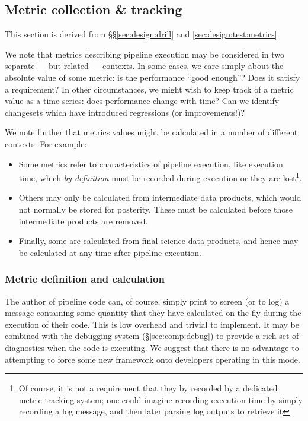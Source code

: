 \subsection{Metric collection \& tracking}
\label{sec:comp:metric}

This section is derived from \S\S\ref{sec:design:drill} and \ref{sec:design:test:metrics}.

We note that metrics describing pipeline execution may be considered in two separate --- but related --- contexts.
In some cases, we care simply about the absolute value of some metric: is the performance ``good enough''?
Does it satisfy a requirement?
In other circumstances, we might wish to keep track of a metric value as a time series: does performance change with time?
Can we identify changesets which have introduced regressions (or improvements!)?

We note further that metrics values might be calculated in a number of different contexts.
For example:

\begin{itemize}

  \item{Some metrics refer to characteristics of pipeline execution, like execution time, which \emph{by definition} must be recorded during execution or they are lost\footnote{Of course, it is not a requirement that they by recorded by a dedicated metric tracking system; one could imagine recording execution time by simply recording a log message, and then later parsing log outputs to retrieve it}.}

  \item{Others may only be calculated from intermediate data products, which would not normally be stored for posterity. These must be calculated before those intermediate products are removed.}

  \item{Finally, some are calculated from final science data products, and hence may be calculated at any time after pipeline execution.}

\end{itemize}

\subsubsection{Metric definition and calculation}
\label{sec:comp:metric:define}

The author of pipeline code can, of course, simply print to screen (or to log) a message containing some quantity that they have calculated on the fly during the execution of their code.
This is low overhead and trivial to implement.
It may be combined with the debugging system (\S\ref{sec:comp:debug}) to provide a rich set of diagnostics when the code is executing.
We suggest that there is no advantage to attempting to force some new framework onto developers operating in this mode.

